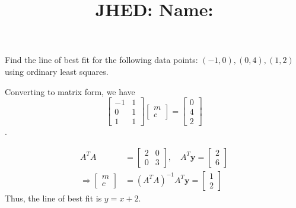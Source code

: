 \documentclass[reqno]{exam}
\title{\normalsize{
  JHED: \underline{\hspace{4cm}} \hspace{1em} Name: \underline{\hspace{9cm}}}
   }
\author{}
\date{}
\begin{document}
\maketitle
\vspace{-2cm} %

\begin{questions}

\question 
Find the line of best fit for the following data points: $(-1, 0), (0, 4), (1, 2)$ using ordinary least squares.
\begin{solution}
Converting to matrix form, we have
\[\begin{bmatrix}
-1 & 1 \\
0 & 1 \\
1 & 1
\end{bmatrix}
\begin{bmatrix}m \\ c
\end{bmatrix} =
\begin{bmatrix}0 \\ 4 \\ 2
\end{bmatrix}\].

\begin{align*}
  A^T A &= \begin{bmatrix}2 & 0 \\ 0 & 3
\end{bmatrix}, \quad
A^T \mathbf{y} = \begin{bmatrix}2 \\ 6
\end{bmatrix} \\
\Rightarrow \begin{bmatrix}m \\ c
\end{bmatrix} &= (A^T A)^{-1} A^T \mathbf{y} = \begin{bmatrix}1 \\ 2  \end{bmatrix}
\end{align*}
Thus, the line of best fit is $y = x + 2$.
\end{solution}

\newpage
\question
{}
\end{questions}
\end{document}
